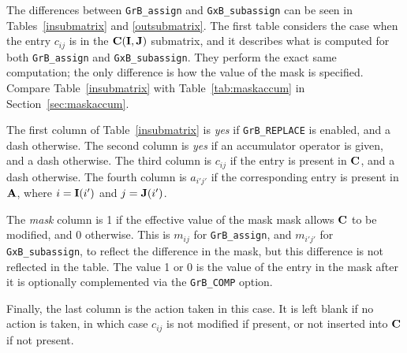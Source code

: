 \documentclass[12pt]{article}
\begin{document}
{\begin{itemize}
\end{itemize}

The differences between \verb'GrB_assign' and
\verb'GxB_subassign' can be seen in Tables~\ref{insubmatrix} and
\ref{outsubmatrix}.  The first table considers the case when the entry $c_{ij}$
is in the ${\bf C(I,J)}$ submatrix, and it describes what is computed for both
\verb'GrB_assign' and \verb'GxB_subassign'.  They perform the
exact same computation; the only difference is how the value of the mask is
specified.  Compare Table~\ref{insubmatrix} with Table~\ref{tab:maskaccum}
in Section~\ref{sec:maskaccum}.

The first column of Table~\ref{insubmatrix} is {\em yes} if \verb'GrB_REPLACE' is enabled,
and a dash otherwise.  The second column is {\em yes} if an accumulator
operator is given, and a dash otherwise.  The third column is $c_{ij}$ if the
entry is present in ${\bf C}$, and a dash otherwise.  The fourth column is
$a_{i'j'}$ if the corresponding entry is present in ${\bf A}$, where
$i={\bf I}(i')$ and $j={\bf J}(i')$.

The {\em mask} column is 1 if the effective value of the mask mask allows ${\bf
C}$ to be modified, and 0 otherwise.  This is $m_{ij}$ for \verb'GrB_assign',
and $m_{i'j'}$ for \verb'GxB_subassign', to reflect the difference in the mask,
but this difference is not reflected in the table.  The value 1 or 0 is the
value of the entry in the mask after it is optionally complemented via the
\verb'GrB_COMP' option.

Finally, the last column is the action taken in this case.  It is left blank if
no action is taken, in which case $c_{ij}$ is not modified if present, or not
inserted into ${\bf C}$ if not present.

}
\end{document}

